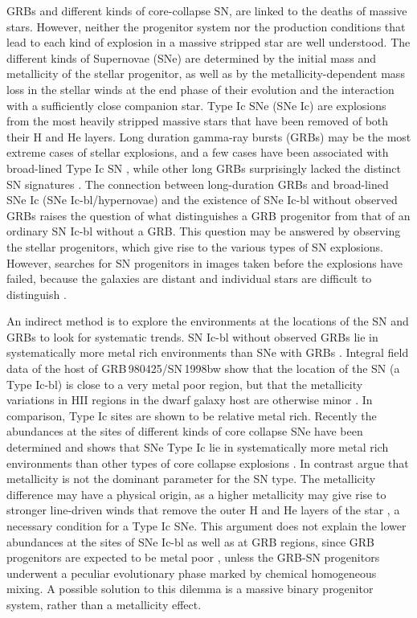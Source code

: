 GRBs and different kinds of core-collapse SN, are linked to the
deaths of massive stars. However, neither the progenitor system nor
  the production conditions that lead to each kind of explosion in a
  massive stripped star are well understood. The different kinds of
  Supernovae (SNe) are determined by the initial mass and metallicity
  of the stellar progenitor, as well as by the metallicity-dependent
  mass loss in the stellar winds at the end phase of their evolution
  and the interaction with a sufficiently close companion star. Type
  Ic SNe (SNe Ic) are explosions from the most heavily stripped
  massive stars that have been removed of both their H and He
  layers. Long duration gamma-ray bursts (GRBs) may be the most
  extreme cases of stellar explosions, and a few cases have been
  associated with broad-lined Type Ic SN \citep{Woosley2006}, while other long GRBs
  surprisingly lacked the distinct SN signatures \citep{Fynbo2006}. The connection
  between long-duration GRBs and broad-lined SNe Ic (SNe
  Ic-bl/hypernovae) and the existence of SNe Ic-bl without observed
  GRBs raises the question of what distinguishes a GRB progenitor from
  that of an ordinary SN Ic-bl without a GRB. This question may be
  answered by observing the stellar progenitors, which give rise to
  the various types of SN explosions. However, searches for SN
  progenitors in images taken before the explosions have failed,
  because the galaxies are distant and individual stars are difficult
  to distinguish \citep{Maund2005}.

 An indirect method is to explore the environments at
the locations of the SN and GRBs to look for systematic trends. SN
Ic-bl without observed GRBs lie in systematically more metal rich
environments than SNe with GRBs \citep{Modjaz2008}. Integral field data of the host
of GRB\,980425/SN\,1998bw show that the location of the SN (a Type
Ic-bl) is close to a very metal poor region, but that the metallicity
variations in HII regions in the dwarf galaxy host are otherwise minor
\citep{Christensen2008}.  In comparison, Type Ic sites are shown to be relative
metal rich. Recently the abundances at the sites of different kinds of
core collapse SNe have been determined and shows that SNe Type Ic lie
in systematically more metal rich environments than other types of
core collapse explosions \citep{Modjaz2011, Leloudas2011, Kuncarayakti2013a, Kelly2012, Graham2013}.  In contrast \citet{Anderson2010} argue
that metallicity is not the dominant parameter for the SN type. The
metallicity difference may have a physical origin, as a higher
metallicity may give rise to stronger line-driven winds that remove
the outer H and He layers of the star \cite{Vink2005}, a necessary condition for
a Type Ic SNe. This argument does not explain the lower abundances at
the sites of SNe Ic-bl as well as at GRB regions, since GRB
progenitors are expected to be metal poor \citep{Woosley1993}, unless the GRB-SN
progenitors underwent a peculiar evolutionary phase marked by chemical
homogeneous mixing. A possible solution to this dilemma is a massive
binary progenitor system, rather than a metallicity effect.


